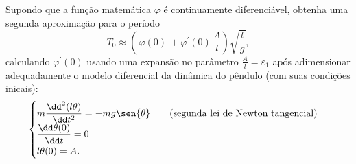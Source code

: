\question
Supondo que a função matemática $\varphi$ é continuamente diferenciável, obtenha
uma segunda aproximação para o período 
\[
  T_0 \approx
		\left(\,
		 \varphi(0)\ + \varphi^{\prime}(0)\,\frac{A}{l}
		\right)
		\sqrt{\frac{l}{g}},
\]
calculando $ \varphi^{\prime}(0) $ usando uma expansão no parâmetro 
$ \frac{A}{l} = \varepsilon_1 $ após adimensionar adequadamente o modelo 
diferencial da dinâmica do pêndulo (com suas condições inicais):
\[
  \begin{cases}
		 m\dfrac{\dd^{2}(l\theta)}{\dd t^2} = -mg\sen{\theta}\qquad \text{(segunda lei de Newton tangencial)}\\
			\dfrac{\dd \theta (0)}{\dd t} = 0\\
			l\theta(0) = A.
  \end{cases}
\]


